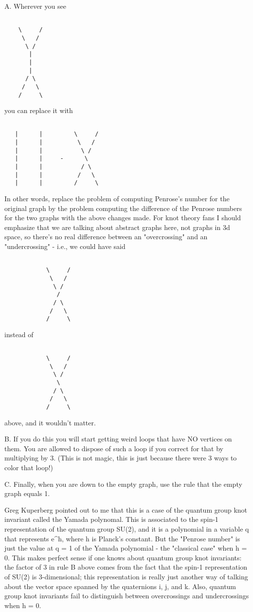 A.  Wherever you see


\begin{verbatim}

    \     /
     \   /
      \ /
       |
       |
       |
      / \
     /   \
    /     \
\end{verbatim}
    

you can replace it with


\begin{verbatim}

   |      |         \     /
   |      |          \   /
   |      |           \ /
   |      |     -      \ 
   |      |           / \
   |      |          /   \
   |      |         /     \
\end{verbatim}
    

In other words, replace the problem of computing Penrose's number for
the original graph by the problem computing the difference of the
Penrose numbers for the two graphs with the above changes made.  For
knot theory fans I should emphasize that we are talking about abstract
graphs here, not graphs in 3d space, so there's no real difference
between an "overcrossing" and an "undercrossing" - i.e., we could have
said


\begin{verbatim}

            \     /
             \   /
              \ /
               / 
              / \
             /   \
            /     \
\end{verbatim}
    

instead of


\begin{verbatim}

            \     /
             \   /
              \ /
               \ 
              / \
             /   \
            /     \
\end{verbatim}
    

above, and it wouldn't matter.

B.  If you do this you will start getting weird loops that have NO
vertices on them.  You are allowed to dispose of such a loop if you
correct for that by multiplying by 3.  (This is not magic, this is just
because there were 3 ways to color that loop!)

C.  Finally, when you are down to the empty graph, use the rule that the
empty graph equals 1. 

Greg Kuperberg pointed out to me that this is a case of the quantum group knot
invariant called the Yamada polynomal.  This is associated to the spin-1
representation of the quantum group SU(2), and it is a polynomial in a
variable q that represents e^h, where h is Planck's constant.
But the "Penrose number" is just the value at q = 1 of the Yamada
polynomial - the "classical case" when h = 0.  This makes perfect
sense if one knows about quantum group knot invariants: the factor of 3
in rule B above comes from the fact that the spin-1 representation of
SU(2) is 3-dimensional; this representation is really just another way
of talking about the vector space spanned by the quaternions i, j, and
k.  Also, quantum group knot invariants fail to distinguish between
overcrossings and undercrossings when h = 0.

